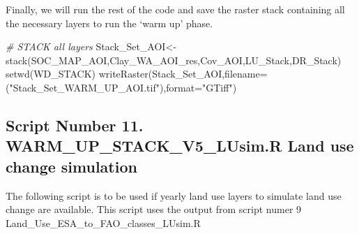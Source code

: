 \documentclass[
  10pt,
  b5paper,
]{book}
\newenvironment{Shaded}{\begin{snugshade}}{\end{snugshade}}
\newcommand{\AttributeTok}[1]{\textcolor[rgb]{0.77,0.63,0.00}{#1}}
\newcommand{\CommentTok}[1]{\textcolor[rgb]{0.56,0.35,0.01}{\textit{#1}}}
\newcommand{\FunctionTok}[1]{\textcolor[rgb]{0.00,0.00,0.00}{#1}}
\newcommand{\NormalTok}[1]{#1}
\newcommand{\OtherTok}[1]{\textcolor[rgb]{0.56,0.35,0.01}{#1}}
\newcommand{\StringTok}[1]{\textcolor[rgb]{0.31,0.60,0.02}{#1}}
\begin{document}
Finally, we will run the rest of the code and save the raster stack containing all the necessary layers to run the `warm up' phase.

\begin{Shaded}
\begin{Highlighting}[]
\CommentTok{\# STACK all layers}
\NormalTok{Stack\_Set\_AOI}\OtherTok{\textless{}{-}}\FunctionTok{stack}\NormalTok{(SOC\_MAP\_AOI,Clay\_WA\_AOI\_res,Cov\_AOI,LU\_Stack,DR\_Stack)}
\FunctionTok{setwd}\NormalTok{(WD\_STACK)}
\FunctionTok{writeRaster}\NormalTok{(Stack\_Set\_AOI,}\AttributeTok{filename=}\NormalTok{(}\StringTok{"Stack\_Set\_WARM\_UP\_AOI.tif"}\NormalTok{),}\AttributeTok{format=}\StringTok{"GTiff"}\NormalTok{)}
\end{Highlighting}
\end{Shaded}

\hypertarget{script-number-11.-warm_up_stack_v5_lusim.r-land-use-change-simulation}{%
\subsection{Script Number 11. WARM\_UP\_STACK\_V5\_LUsim.R Land use change simulation}\label{script-number-11.-warm_up_stack_v5_lusim.r-land-use-change-simulation}}

The following script is to be used if yearly land use layers to simulate land use change are available. This script uses the output from script numer 9 Land\_Use\_ESA\_to\_FAO\_classes\_LUsim.R
\end{document}
